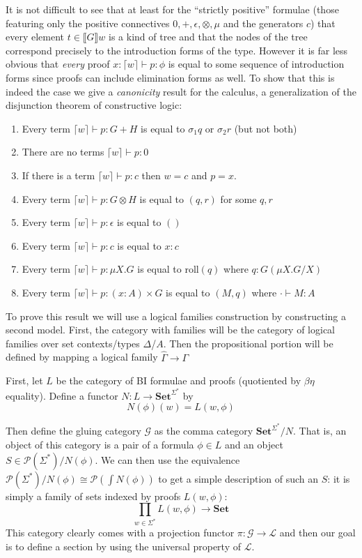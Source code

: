 \documentclass[sigconf,anonymous,review,screen]{acmart}
\newcommand{\Set}{\mathbf{Set}}
\begin{document}
It is not difficult to see that at least for the ``strictly positive''
formulae (those featuring only the positive connectives
$0,+,\epsilon,\otimes,\mu$ and the generators $c$) that every element
$t \in \llbracket G \rrbracket w$ is a kind of tree and that the nodes
of the tree correspond precisely to the introduction forms of the
type. However it is far less obvious that \emph{every} proof $x:\lceil
w \rceil \vdash p : \phi$ is equal to some sequence of introduction
forms since proofs can include elimination forms as well. To show that
this is indeed the case we give a \emph{canonicity} result for the
calculus, a generalization of the disjunction theorem of constructive
logic:
\begin{enumerate}
\item Every term $\lceil w \rceil \vdash p : G + H$ is equal to $\sigma_1q$ or $\sigma_2 r$ (but not both)
\item There are no terms $\lceil w \rceil \vdash p : 0$
\item If there is a term $\lceil w \rceil \vdash p : c$ then $w = c$ and $p = x$.
\item Every term $\lceil w \rceil \vdash p : G \otimes H$ is equal to $(q,r)$ for some $q,r$
\item Every term $\lceil w \rceil \vdash p : \epsilon$ is equal to $()$
\item Every term $\lceil w \rceil \vdash p : c$ is equal to $x:c$
\item Every term $\lceil w \rceil \vdash p : \mu X. G$ is equal to $\textrm{roll}(q)$ where $q : G(\mu X.G/X)$
\item Every term $\lceil w \rceil \vdash p : (x:A) \times G$ is equal
  to $(M,q)$ where $\cdot \vdash M : A$
\end{enumerate}

To prove this result we will use a logical families construction by
constructing a second model. First, the category with families will be
the category of logical families over set contexts/types
$\Delta$/$A$. Then the propositional portion will be defined by
mapping a logical family $\hat \Gamma \to \Gamma$ 

First, let $L$ be the category of BI formulae and proofs (quotiented
by $\beta\eta$ equality). Define a functor $N : L \to \Set^{\Sigma^*}$ by
\[ N(\phi)(w) = L(w,\phi) \]

Then define the gluing category $\mathcal G$ as the comma category
$\Set^{\Sigma^*}/N$. That is, an object of this category is a pair of
a formula $\phi \in L$ and an object $S \in \mathcal
P(\Sigma^*)/N(\phi)$. We can then use the equivalence $\mathcal
P(\Sigma^*)/N(\phi) \cong \mathcal P(\int N(\phi))$ to get a simple
description of such an $S$: it is simply a family of sets indexed by
proofs $L(w,\phi)$:
\[ \prod_{w\in\Sigma^*} L(w,\phi) \to \Set \]
This category clearly comes with a projection functor $\pi : \mathcal
G \to \mathcal L$ and then our goal is to define a section by using
the universal property of $\mathcal L$.
\end{document}
